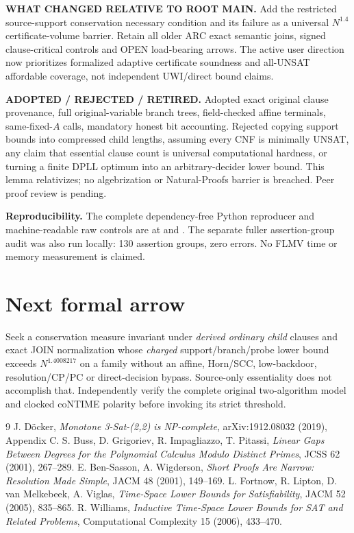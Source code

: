 \documentclass[11pt]{article}
\begin{document}
\textbf{WHAT CHANGED RELATIVE TO ROOT MAIN.} Add the restricted source-support conservation necessary condition and its failure as a universal $N^{1.4}$ certificate-volume barrier. Retain all older ARC exact semantic joins, signed clause-critical controls and OPEN load-bearing arrows. The active user direction now prioritizes formalized adaptive certificate soundness and all-UNSAT affordable coverage, not independent UWI/direct bound claims.

\textbf{ADOPTED / REJECTED / RETIRED.} Adopted exact original clause provenance, full original-variable branch trees, field-checked affine terminals, same-fixed-$A$ calls, mandatory honest bit accounting. Rejected copying support bounds into compressed child lengths, assuming every CNF is minimally UNSAT, any claim that essential clause count is universal computational hardness, or turning a finite DPLL optimum into an arbitrary-decider lower bound. This lemma relativizes; no algebrization or Natural-Proofs barrier is breached. Peer proof review is pending.

\textbf{Reproducibility.} The complete dependency-free Python reproducer and machine-readable raw controls are at
 and
.
The separate fuller assertion-group audit was also run locally: 130 assertion groups, zero errors. No FLMV time or memory measurement is claimed.

\section{Next formal arrow}
Seek a conservation measure invariant under \emph{derived ordinary child} clauses and exact JOIN normalization whose \emph{charged} support/branch/probe lower bound exceeds $N^{1.4008217}$ on a family without an affine, Horn/SCC, low-backdoor, resolution/CP/PC or direct-decision bypass. Source-only essentiality does not accomplish that. Independently verify the complete original two-algorithm model and clocked coNTIME polarity before invoking its strict threshold.

\begin{thebibliography}{9}
 J. D\"ocker, \emph{Monotone 3-Sat-(2,2) is NP-complete}, arXiv:1912.08032 (2019), Appendix C.
 S. Buss, D. Grigoriev, R. Impagliazzo, T. Pitassi, \emph{Linear Gaps Between Degrees for the Polynomial Calculus Modulo Distinct Primes}, JCSS 62 (2001), 267--289.
 E. Ben-Sasson, A. Wigderson, \emph{Short Proofs Are Narrow: Resolution Made Simple}, JACM 48 (2001), 149--169.
 L. Fortnow, R. Lipton, D. van Melkebeek, A. Viglas, \emph{Time-Space Lower Bounds for Satisfiability}, JACM 52 (2005), 835--865.
 R. Williams, \emph{Inductive Time-Space Lower Bounds for SAT and Related Problems}, Computational Complexity 15 (2006), 433--470.
\end{thebibliography}
\end{document}

